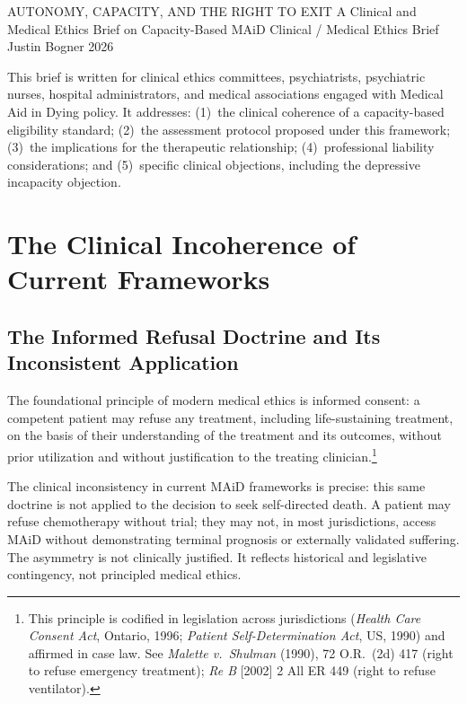 \documentclass[11pt, letterpaper]{article}
\begin{document}
\campaigntitle%
  {AUTONOMY, CAPACITY, AND THE RIGHT TO EXIT}%
  {A Clinical and Medical Ethics Brief on Capacity-Based MAiD}%
  {Clinical / Medical Ethics Brief}%
  {Justin Bogner}%
  {2026}

\suitenote

\begin{policybox}[title={\sffamily\bfseries\small\color{C@accent}
  Purpose and Audience}]
This brief is written for clinical ethics committees, psychiatrists, psychiatric
nurses, hospital administrators, and medical associations engaged with Medical Aid in
Dying policy. It addresses: (1)~the clinical coherence of a capacity-based eligibility
standard; (2)~the assessment protocol proposed under this framework; (3)~the
implications for the therapeutic relationship; (4)~professional liability considerations;
and (5)~specific clinical objections, including the depressive incapacity objection.
\end{policybox}

\bigskip

\section{The Clinical Incoherence of Current Frameworks}

\subsection{The Informed Refusal Doctrine and Its Inconsistent Application}

The foundational principle of modern medical ethics is informed consent: a competent
patient may refuse any treatment, including life-sustaining treatment, on the basis of
their understanding of the treatment and its outcomes, without prior utilization and
without justification to the treating clinician.\footnote{%
  This principle is codified in legislation across jurisdictions (\textit{Health Care
  Consent Act}, Ontario, 1996; \textit{Patient Self-Determination Act}, US, 1990) and
  affirmed in case law. See \textit{Malette v.\ Shulman} (1990), 72 O.R.\ (2d) 417
  (right to refuse emergency treatment); \textit{Re B} [2002] 2 All ER 449 (right to
  refuse ventilator).}

The clinical inconsistency in current MAiD frameworks is precise: this same doctrine is
not applied to the decision to seek self-directed death. A patient may refuse
chemotherapy without trial; they may not, in most jurisdictions, access MAiD without
demonstrating terminal prognosis or externally validated suffering. The asymmetry is
not clinically justified. It reflects historical and legislative contingency, not
principled medical ethics.
\end{document}
